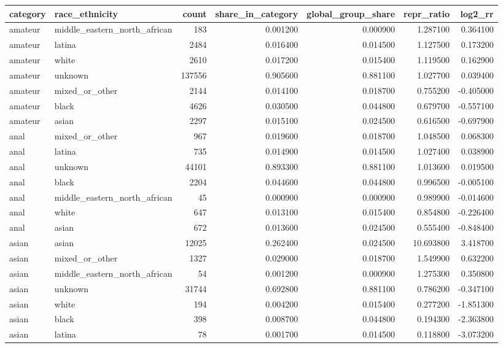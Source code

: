 \begin{tabular}{llrrrrr}
\toprule
category & race_ethnicity & count & share_in_category & global_group_share & repr_ratio & log2_rr \\
\midrule
amateur & middle_eastern_north_african & 183 & 0.001200 & 0.000900 & 1.287100 & 0.364100 \\
amateur & latina & 2484 & 0.016400 & 0.014500 & 1.127500 & 0.173200 \\
amateur & white & 2610 & 0.017200 & 0.015400 & 1.119500 & 0.162900 \\
amateur & unknown & 137556 & 0.905600 & 0.881100 & 1.027700 & 0.039400 \\
amateur & mixed_or_other & 2144 & 0.014100 & 0.018700 & 0.755200 & -0.405000 \\
amateur & black & 4626 & 0.030500 & 0.044800 & 0.679700 & -0.557100 \\
amateur & asian & 2297 & 0.015100 & 0.024500 & 0.616500 & -0.697900 \\
anal & mixed_or_other & 967 & 0.019600 & 0.018700 & 1.048500 & 0.068300 \\
anal & latina & 735 & 0.014900 & 0.014500 & 1.027400 & 0.038900 \\
anal & unknown & 44101 & 0.893300 & 0.881100 & 1.013600 & 0.019500 \\
anal & black & 2204 & 0.044600 & 0.044800 & 0.996500 & -0.005100 \\
anal & middle_eastern_north_african & 45 & 0.000900 & 0.000900 & 0.989900 & -0.014600 \\
anal & white & 647 & 0.013100 & 0.015400 & 0.854800 & -0.226400 \\
anal & asian & 672 & 0.013600 & 0.024500 & 0.555400 & -0.848400 \\
asian & asian & 12025 & 0.262400 & 0.024500 & 10.693800 & 3.418700 \\
asian & mixed_or_other & 1327 & 0.029000 & 0.018700 & 1.549900 & 0.632200 \\
asian & middle_eastern_north_african & 54 & 0.001200 & 0.000900 & 1.275300 & 0.350800 \\
asian & unknown & 31744 & 0.692800 & 0.881100 & 0.786200 & -0.347100 \\
asian & white & 194 & 0.004200 & 0.015400 & 0.277200 & -1.851300 \\
asian & black & 398 & 0.008700 & 0.044800 & 0.194300 & -2.363800 \\
asian & latina & 78 & 0.001700 & 0.014500 & 0.118800 & -3.073200 \\

\end{tabular}
